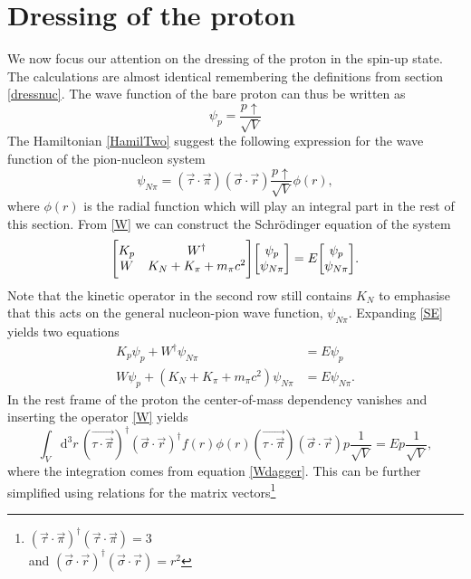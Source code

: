 \section{Dressing of the proton} \label{sec:DressingofProton}
We now focus our attention on the dressing of the proton in the spin-up state. The calculations are almost identical remembering the definitions from section \ref{dressnuc}. The wave function of the bare proton can thus be written as
\begin{equation} \label{bareproton}
	\psi_p = \frac{p\uparrow}{\sqrt{V}}
\end{equation}
The Hamiltonian \eqref{HamilTwo} suggest the following expression for the wave function of the pion-nucleon system
\begin{equation} \label{pionnuc}
	\psi_{N\pi} = (\vec{\tau}\cdot\vec{\pi})(\vec{\sigma}\cdot\vec{r})\frac{p \uparrow}{\sqrt{V}}\phi(r),
\end{equation}
where $\phi(r)$ is the radial function which will play an integral part in the rest of this section.
From \eqref{W} we can construct the Schrödinger equation of the system
\begin{equation}\label{SE}
	\mqty[K_{p} & W^\dagger \\ W & K_{N}+K_{\pi}+m_\pi c^2]\mqty[\psi_p \\ \psi_{N\pi}] = E \mqty[\psi_p \\ \psi_{N\pi}].
\end{equation}
Note that the kinetic operator in the second row still contains $K_N$ to emphasise that this acts on the general nucleon-pion wave function, $\psi_{N\pi}$. Expanding \eqref{SE} yields two equations
\begin{align}
	K_{p}\psi_p + W^\dagger \psi_{N\pi} & = E\psi_p \label{SE1} \\
	W\psi_p + (K_{N}+K_{\pi}+m_\pi c^2)\psi_{N\pi} & = E\psi_{N\pi} \label{SE2}.
\end{align}
In the rest frame of the proton the center-of-mass dependency vanishes and inserting the operator \eqref{W} yields
\begin{equation}
	\int_V \text{d}^3r \, (\vec{\tau\cdot\vec{\pi}})^\dagger(\vec{\sigma}\cdot\vec{r})^\dagger f(r)\phi(r)(\vec{\tau\cdot\vec{\pi}})(\vec{\sigma}\cdot\vec{r})p\frac{1}{\sqrt{V}} = E p\frac{1}{\sqrt{V}},
\end{equation}
where the integration comes from equation \eqref{Wdagger}. This can be further simplified using relations for the matrix vectors\footnote{$(\vec{\tau}\cdot \vec{\pi})^\dagger(\vec{\tau}\cdot \vec{\pi}) = 3$ \\ and
	$(\vec{\sigma}\cdot \vec{r})^\dagger(\vec{\sigma}\cdot \vec{r}) = r^2$}
